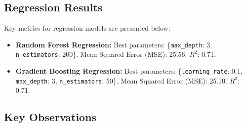 \documentclass[conference]{IEEEtran}
\begin{document}
\subsection{Regression Results}
Key metrics for regression models are presented below:
\begin{itemize}
    \item \textbf{Random Forest Regression:} Best parameters: \{\texttt{max\_depth}: 3, \texttt{n\_estimators}: 200\}. Mean Squared Error (MSE): 25.56. $R^2$: 0.71.
    \item \textbf{Gradient Boosting Regression:} Best parameters: \{\texttt{learning\_rate}: 0.1, \texttt{max\_depth}: 3, \texttt{n\_estimators}: 50\}. Mean Squared Error (MSE): 25.10. $R^2$: 0.71.
\end{itemize}

\subsection{Key Observations}
\end{document}
